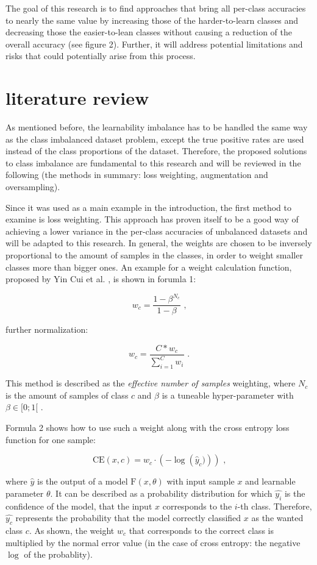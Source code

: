\documentclass[journal]{IEEEtran}
\begin{document}
The goal of this research is to find approaches that bring all per-class accuracies to nearly the same value by increasing those of the harder-to-learn classes
and decreasing those the easier-to-lean classes without causing a reduction of the overall accuracy (see figure 2).
Further, it will address potential limitations and risks that could potentially arise from this process.

\section{literature review}
As mentioned before, the learnability imbalance has to be handled the same way as the class imbalanced dataset problem, except the true positive rates are used instead of the class proportions of the dataset.
Therefore, the proposed solutions to class imbalance are fundamental to this research and will be reviewed in the following (the methods in summary: loss weighting, augmentation and oversampling).

Since it was used as a main example in the introduction, the first method to examine is loss weighting. 
This approach has proven itself to be a good way of achieving a lower variance in the per-class accuracies of unbalanced datasets and will be adapted to this research. 
In general, the weights are chosen to be inversely proportional to the amount of samples in the classes, in order to weight smaller classes more than bigger ones. 
An example for a weight calculation function, proposed by Yin Cui et al. \cite{cui2019class}, is shown in forumla 1:

\[ w_c = \frac{1-\beta^{N_c}}{1-\beta} \text{ ,} \]

further normalization:

\[ w_c = \frac{C * w_c}{\sum_{i=1}^{C}w_i} \text{ .} \]

This method is described as the \emph{effective number of samples} weighting, where $N_c$ is the amount of samples of class $c$ and $\beta$ is a tuneable hyper-parameter with $\beta \in [0;1[$ .

Formula 2 shows how to use such a weight along with the cross entropy loss function for one sample:

\[ \text{CE}(x, c) = w_{c} \cdot \left(-\log\left(\hat{y}_c)\right) \right) \text{ ,} \]

where $\hat{y}$ is the output of a model $\text{F}(x, \theta)$ with input sample $x$ and learnable parameter $\theta$. 
It can be described as a probability distribution for which $\hat{y_i}$ is the confidence of the model, that the input $x$ corresponds to the $i$-th class.
Therefore, $\hat{y_c}$ represents the probability that the model correctly classified $x$ as the wanted class $c$. 
As shown, the weight $w_c$ that corresponds to the correct class is multiplied by the normal error value (in the case of cross entropy: the negative $\log$ of the probablity).
\end{document}
